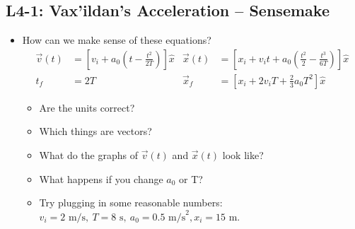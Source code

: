 \documentclass[]{article}
\begin{document}
\begin{PresentSpace}
\vspace{-10pt}
\section*{L4-1: Vax'ildan's Acceleration -- Sensemake}
\vspace{-10pt}
\begin{itemize}
	\item How can we make sense of these equations?
	\begin{align*}
		\vec{v}(t) & = \left[v_{i}+a_{0}\left(t-\frac{t^{2}}{2T}\right)\right]\hat{x} & \vec{x}(t) & = \left[x_{i}+v_{i}t+a_{0}\left(\frac{t^{2}}{2}-\frac{t^{3}}{6T}\right)\right]\hat{x} \\
		t_{f} & = 2T & \vec{x}_{f} & = \left[x_{i}+2v_{i}T+\frac{2}{3}a_{0}T^{2}\right]\hat{x}
	\end{align*}
	\begin{itemize}
		\item Are the units correct?
		\item Which things are vectors?
		\item What do the graphs of $\vec{v}(t)$ and $\vec{x}(t)$ look like?
		\item What happens if you change $a_{0}$ or T?
		\item Try plugging in some reasonable numbers: $v_{i} = 2 \text{ m/s},\ T = 8 \text{ s},\ a_{0} = 0.5 \text{ m/s}^{2}, x_{i} = 15 \text{ m}$.
	\end{itemize}
\end{itemize}
\end{PresentSpace}
\newpage
\end{document}
